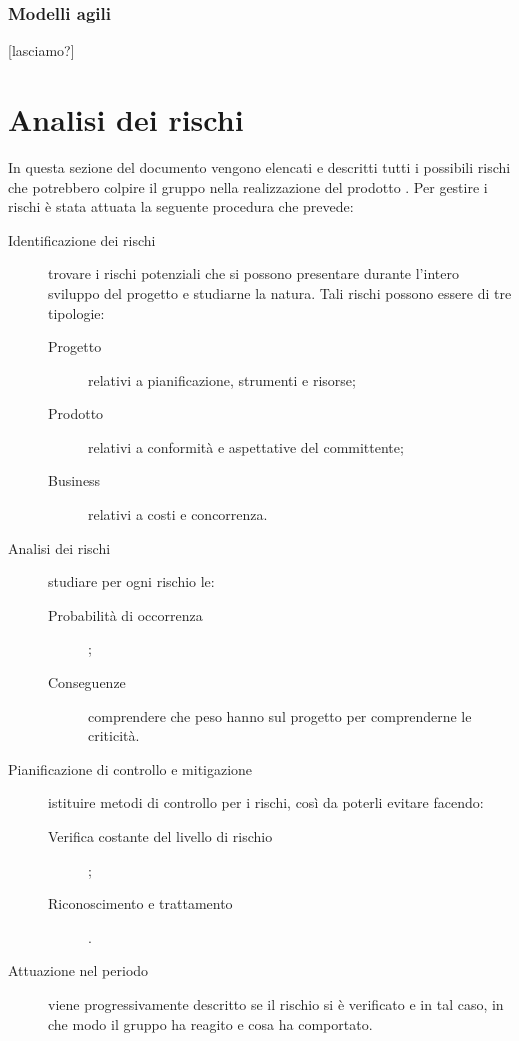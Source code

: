 		\subsubsection{Modelli agili}
[lasciamo?]



\section{Analisi dei rischi} \label{sec:analisi}
In questa sezione del documento vengono elencati e descritti tutti i possibili rischi che potrebbero colpire il gruppo \hx{} nella realizzazione del prodotto \proj. Per gestire i rischi è stata attuata la seguente procedura che prevede:
\begin{description}
	\item[Identificazione dei rischi] trovare i rischi potenziali che si possono presentare durante l'intero sviluppo del progetto e studiarne la natura. Tali rischi possono essere di tre tipologie:
	\begin{description}
		\item[Progetto] relativi a pianificazione, strumenti e risorse;
		\item[Prodotto] relativi a conformità e aspettative del committente;
		\item[Business] relativi a costi e concorrenza.
	\end{description}
	\item[Analisi dei rischi] studiare per ogni rischio le:
	\begin{description}
		\item[Probabilità di occorrenza];
		\item[Conseguenze] comprendere che peso hanno sul progetto per comprenderne le criticità.
	\end{description}
	\item[Pianificazione di controllo e mitigazione] istituire metodi di controllo per i rischi, così da poterli evitare facendo:
	\begin{description}
		\item[Verifica costante del livello di rischio];
		\item[Riconoscimento e trattamento].
	\end{description}
	\item[Attuazione nel periodo] viene progressivamente descritto se il rischio si è verificato e in tal caso, in che modo il gruppo ha reagito e cosa ha comportato.
\end{description}
